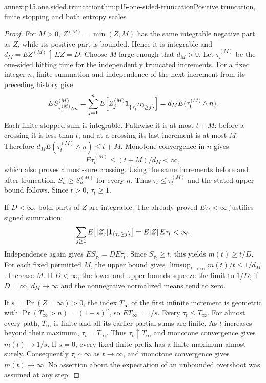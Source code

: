 \begin{annexitem}{annex:p15.one.sided.truncation}{thm:p15-one-sided-truncation}{Positive truncation, finite stopping and both entropy scales}
\begin{proof}
For \(M>0\), \(Z^{(M)}=\min(Z,M)\) has the same integrable negative
part as \(Z\), while its positive part is bounded. Hence it is
integrable and \(d_M=EZ^{(M)}\uparrow EZ=D\).
Choose \(M\) large enough that \(d_M>0\).
Let \(\tau_t^{(M)}\) be the one-sided hitting time for the independently
truncated increments. For a fixed integer \(n\), finite summation and
independence of the next increment from its preceding history give
\[
 E S^{(M)}_{\tau_t^{(M)}\wedge n}
 =\sum_{j=1}^n E\!\left[Z_j^{(M)}
                 {\bf1}_{\{\tau_t^{(M)}\geq j\}}\right]
 =d_M E(\tau_t^{(M)}\wedge n).
\]
Each finite stopped sum is integrable. Pathwise it is at most \(t+M\):
before a crossing it is less than \(t\), and at a crossing its
last increment is at most \(M\).
Therefore
\(d_M E(\tau_t^{(M)}\wedge n)\leq t+M\).
Monotone convergence in \(n\) gives
\[
 E\tau_t^{(M)}\leq(t+M)/d_M<\infty,
\]
which also proves almost-sure crossing.
Using the same increments before and after truncation,
\(S_n\geq S_n^{(M)}\) for every \(n\). Thus
\(\tau_t\leq\tau_t^{(M)}\) and the stated upper bound follows.
Since \(t>0\), \(\tau_t\geq1\).

If \(D<\infty\), both parts of \(Z\) are integrable.
The already proved \(E\tau_t<\infty\) justifies signed summation:
\[
 \sum_{j\geq1}E\!\left[|Z_j|{\bf1}_{\{\tau_t\geq j\}}\right]
 =E|Z|\,E\tau_t<\infty.
\]
Independence again gives \(ES_{\tau_t}=D E\tau_t\).
Since \(S_{\tau_t}\geq t\), this yields \(m(t)\geq t/D\).
For each fixed permitted \(M\), the upper bound gives
\(\limsup_{t\to\infty}m(t)/t\leq1/d_M\).
Increase \(M\). If \(D<\infty\), the lower and upper bounds squeeze
the limit to \(1/D\); if \(D=\infty\), \(d_M\to\infty\) and the
nonnegative normalized means tend to zero.

If \(s=\Pr(Z=\infty)>0\), the index \(T_\infty\) of the first infinite
increment is geometric with
\(\Pr(T_\infty>n)=(1-s)^n\), so \(ET_\infty=1/s\).
Every \(\tau_t\leq T_\infty\).
For almost every path, \(T_\infty\) is finite and all its earlier
partial sums are finite. As \(t\) increases beyond their maximum,
\(\tau_t=T_\infty\). Thus \(\tau_t\uparrow T_\infty\) and
monotone convergence gives \(m(t)\to1/s\).
If \(s=0\), every fixed finite prefix has a finite maximum almost surely.
Consequently \(\tau_t\uparrow\infty\) as \(t\to\infty\), and
monotone convergence gives \(m(t)\to\infty\).
No assertion about the expectation of an unbounded overshoot was
assumed at any step.
\end{proof}
\end{annexitem}

